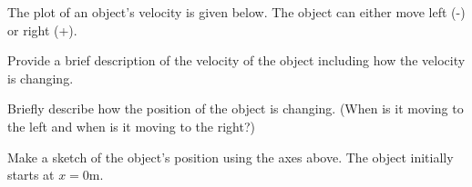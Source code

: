 
\begin{problem}
  \item The plot of an object's velocity is given below. The object
    can either move left (-) or right (+).

  \scalebox{0.7 }{}

    \begin {subproblem}
      \item Provide a brief description of the velocity of the object
        including how the velocity is changing.
        \vfill

      \item Briefly describe how the position of the object is
        changing. (When is it moving to the left and when is it moving
        to the right?)
        \vfill

      \item Make a sketch of the object's position using the axes above.
            The object initially starts at $x=0$m.
    \end{subproblem}

\end{problem}


